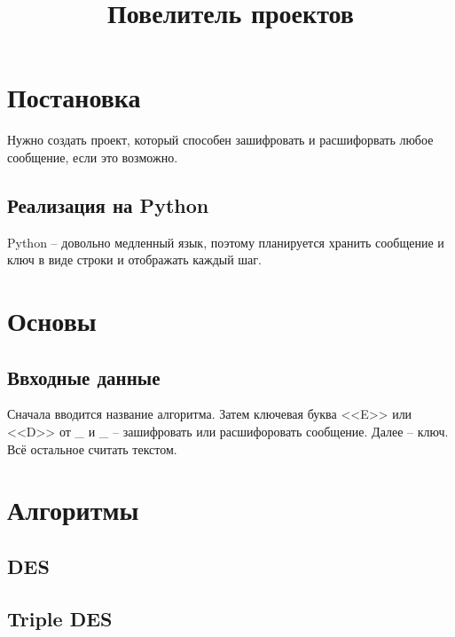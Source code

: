 \documentclass{article}
\title{Повелитель проектов}
\begin{document}
\maketitle
\tableofcontents
\newpage
\section{Постановка}
	Нужно создать проект, который способен зашифровать и расшифорвать любое сообщение, если это возможно.
	\subsection{Реализация на Python}
		Python -- довольно медленный язык, поэтому планируется хранить сообщение и ключ в виде строки и отображать каждый шаг.
\section{Основы}
	\subsection{Ввходные данные}
	Сначала вводится название алгоритма.
	Затем ключевая буква <<E>> или <<D>> от \_ и \_ -- зашифровать или расшифоровать сообщение.
	Далее -- ключ.
	Всё остальное считать текстом.\\
\section{Алгоритмы}
	\subsection{DES}
	\subsection{Triple DES}
\end{document}
